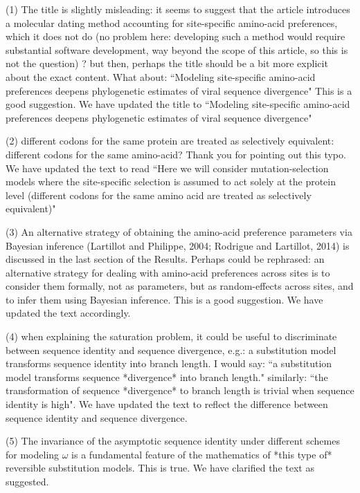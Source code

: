 \documentclass[11pt, oneside]{article}   	%
\newcommand{\response}[1]{{\color{black}#1}}
\begin{document}
(1) The title is slightly misleading: it seems to suggest that the article introduces a molecular dating method accounting for site-specific amino-acid preferences, which it does not do (no problem here: developing such a method would require substantial software development, way beyond the scope of this article, so this is not the question) ? but then, perhaps the title should be a bit more explicit about the exact content. 
What about:  ``Modeling site-specific amino-acid preferences deepens phylogenetic estimates of viral sequence divergence" 
\response{This is a good suggestion. 
We have updated the title to ``Modeling site-specific amino-acid preferences deepens phylogenetic estimates of viral sequence divergence"}

(2) different codons for the same protein are treated as selectively equivalent: different codons for the same amino-acid? 
\response{Thank you for pointing out this typo. 
We have updated the text to read ``Here we will consider mutation-selection models where the site-specific selection is assumed to act solely at the protein level (different codons for the same amino acid are treated as selectively equivalent)"}

(3) An alternative strategy of obtaining the amino-acid preference parameters via Bayesian inference (Lartillot and Philippe, 2004; Rodrigue and Lartillot, 2014) is discussed in the last section of the Results. 
Perhaps could be rephrased: an alternative strategy for dealing with amino-acid preferences across sites is to consider them formally, not as parameters, but as random-effects across sites, and to infer them using Bayesian inference.
\response{This is a good suggestion. We have updated the text accordingly.}

(4) when explaining the saturation problem, it could be useful to discriminate between sequence identity and sequence divergence, e.g.: 
a substitution model transforms sequence identity into branch length. I would say: ``a substitution model transforms sequence *divergence* into branch length." 
similarly: 
``the transformation of sequence *divergence* to branch length is trivial when sequence identity is high". 
\response{We have updated the text to reflect the difference between sequence identity and sequence divergence.}

(5) The invariance of the asymptotic sequence identity under different schemes for modeling $\omega$ is a fundamental feature of the mathematics of *this type of* reversible substitution models. 
\response{This is true. We have clarified the text as suggested.}
\end{document}
